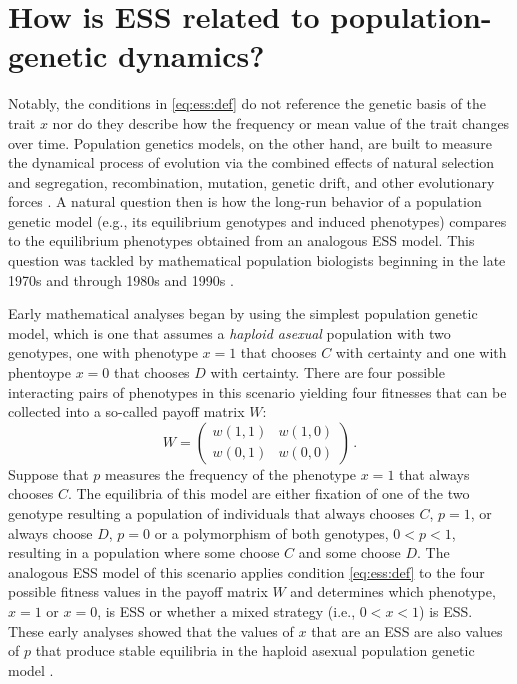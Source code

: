 \documentclass[11pt]{article}
\newcommand{\w}{w}
\begin{document}
\section{How is ESS related to population-genetic dynamics?}

Notably, the conditions in \eqref{eq:ess:def} do not reference the genetic basis of the trait $x$ nor do they describe how the frequency or mean value of the trait changes over time. Population genetics models, on the other hand, are built to measure the dynamical process of evolution via the combined effects of natural selection and segregation, recombination, mutation, genetic drift, and other evolutionary forces \cite{Crow:Kimura:1970,Ewens:2004}. A natural question then is how the long-run behavior of a population genetic model (e.g., its equilibrium genotypes and induced phenotypes) compares to the equilibrium phenotypes obtained from an analogous ESS model. This question was tackled by mathematical population biologists beginning in the late 1970s and through 1980s and 1990s \cite[e..g,][]{Taylor:Jonker:1978,Hofbauer:Schuster:1979,Zeeman:1980,Eshel:1982,Hofbauer:Schuster:1982,Cressman:Hines:1984,Eshel:Feldman:1984,Lessard:1984,Cressman:1988,Cressman:Hofbauer:1996,Eshel:1996,Hammerstein:1996,Weissing:1996}.

Early mathematical analyses began by using the simplest population genetic model, which is one that assumes a \textit{haploid asexual} population with two genotypes, one with phenotype $x=1$ that chooses $C$ with certainty and one with phentoype $x=0$ that chooses $D$ with certainty. There are four possible interacting pairs of phenotypes in this scenario yielding four fitnesses that can be collected into a so-called payoff matrix $W$:
\begin{equation*}
  W =
  \begin{pmatrix}
    \w(1,1) & \w(1,0) \\
    \w(0,1) & \w(0,0)
  \end{pmatrix} \, .
\end{equation*}
Suppose that $p$ measures the frequency of the phenotype $x=1$ that always chooses $C$. The equilibria of this model are either fixation of one of the two genotype resulting a population of individuals that always chooses $C$, $p=1$, or always choose $D$, $p=0$ or a polymorphism of both genotypes, $0 < p < 1$, resulting in a population where some choose $C$ and some choose $D$. The analogous ESS model of this scenario applies condition \eqref{eq:ess:def} to the four possible fitness values in the payoff matrix $W$ and determines which phenotype, $x=1$ or $x=0$, is ESS or whether a mixed strategy (i.e., $0 < x < 1$) is ESS. These early analyses showed that the values of $x$ that are an ESS are also values of $p$ that produce stable equilibria in the haploid asexual population genetic model \cite{Taylor:Jonker:1978,Hofbauer:Schuster:1979,Zeeman:1980,Hofbauer:Sigmund:1998}.
\end{document}
